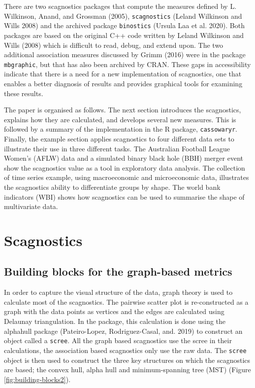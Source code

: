 There are two scagnostics packages that compute the measures defined by L. Wilkinson, Anand, and Grossman (2005), \texttt{scagnostics} (Leland Wilkinson and Wills 2008) and the archived package \texttt{binostics} (Ursula Laa et al. 2020). Both packages are based on the original C++ code written by Leland Wilkinson and Wills (2008) which is difficult to read, debug, and extend upon. The two additional association measures discussed by Grimm (2016) were in the package \texttt{mbgraphic}, but that has also been archived by CRAN. These gaps in accessibility indicate that there is a need for a new implementation of scagnostics, one that enables a better diagnosis of results and provides graphical tools for examining these results.

The paper is organised as follows. The next section introduces the scagnostics, explains how they are calculated, and develops several new measures. This is followed by a summary of the implementation in the R package, \texttt{cassowaryr}. Finally, the example section applies scagnostics to four different data sets to illustrate their use in three different tasks. The Australian Football League Women's (AFLW) data and a simulated binary black hole (BBH) merger event show the scagnostics value as a tool in exploratory data analysis. The collection of time series example, using macroeconomic and microeconomic data, illustrates the scagnostics ability to differentiate groups by shape. The world bank indicators (WBI) shows how scagnostics can be used to summarise the shape of multivariate data.

\hypertarget{scagnostics}{%
\section{Scagnostics}\label{scagnostics}}

\hypertarget{building-blocks-for-the-graph-based-metrics}{%
\subsection{Building blocks for the graph-based metrics}\label{building-blocks-for-the-graph-based-metrics}}

In order to capture the visual structure of the data, graph theory is used to calculate most of the scagnostics. The pairwise scatter plot is re-constructed as a graph with the data points as vertices and the edges are calculated using Delaunay triangulation. In the package, this calculation is done using the alphahull package (Pateiro-Lopez, Rodriguez-Casal, and. 2019) to construct an object called a \texttt{scree}. All the graph based scagnostics use the scree in their calculations, the association based scagnostics only use the raw data. The \texttt{scree} object is then used to construct the three key structures on which the scagnostics are based; the convex hull, alpha hull and minimum-spanning tree (MST) (Figure \ref{fig:building-blocks2}).

